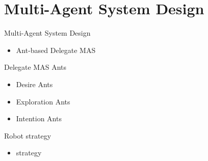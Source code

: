 \section{Multi-Agent System Design}

\begin{frame}{Multi-Agent System Design}
    \begin{itemize}
        \item Ant-based Delegate MAS
    \end{itemize}
\end{frame}

\begin{frame}{Delegate MAS Ants}
    \begin{itemize}
        \item Desire Ants
        \item Exploration Ants
        \item Intention Ants
    \end{itemize}
\end{frame}


\begin{frame}{Robot strategy}
    \begin{itemize}
        \item strategy
    \end{itemize}
\end{frame}

